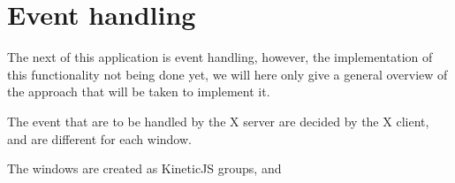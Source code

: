 \section{Event handling}
%
The next of this application is event handling, however, the implementation of this 
functionality not being done yet, we will here only give a general overview of the 
approach that will be taken to implement it.

The event that are to be handled by the X server are decided by the X client, 
and are different for each window.

The windows are created as KineticJS groups, and 

